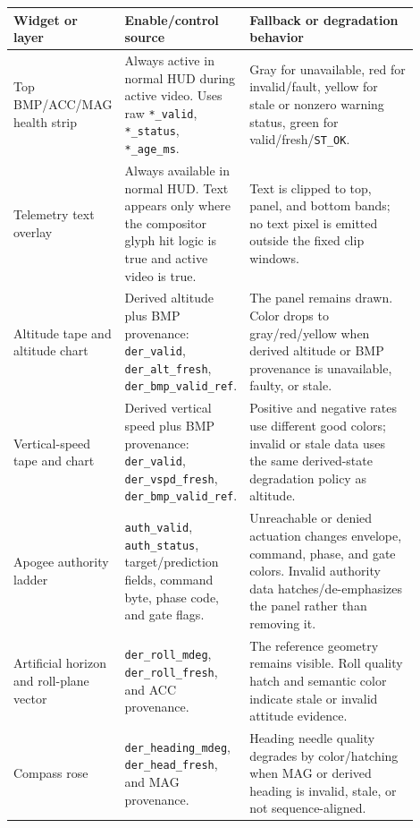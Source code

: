 \documentclass{article}
\newcommand{\sig}[1]{\begingroup\nolinkurl{#1}\endgroup}
\begin{document}
\begin{longtable}{p{0.24\linewidth} p{0.24\linewidth} p{0.42\linewidth}}
\toprule
\textbf{Widget or layer} & \textbf{Enable/control source} & \textbf{Fallback or degradation behavior} \\
\midrule
\endhead
Top BMP/ACC/MAG health strip &
Always active in normal HUD during active video.  Uses raw
\sig{*_valid}, \sig{*_status}, \sig{*_age_ms}. &
Gray for unavailable, red for invalid/fault, yellow for stale or nonzero
warning status, green for valid/fresh/\sig{ST_OK}. \\

Telemetry text overlay &
Always available in normal HUD.  Text appears only where the compositor glyph
hit logic is true and active video is true. &
Text is clipped to top, panel, and bottom bands; no text pixel is emitted
outside the fixed clip windows. \\

Altitude tape and altitude chart &
Derived altitude plus BMP provenance:
\sig{der_valid}, \sig{der_alt_fresh}, \sig{der_bmp_valid_ref}. &
The panel remains drawn.  Color drops to gray/red/yellow when derived altitude
or BMP provenance is unavailable, faulty, or stale. \\

Vertical-speed tape and chart &
Derived vertical speed plus BMP provenance:
\sig{der_valid}, \sig{der_vspd_fresh}, \sig{der_bmp_valid_ref}. &
Positive and negative rates use different good colors; invalid or stale data
uses the same derived-state degradation policy as altitude. \\

Apogee authority ladder &
\sig{auth_valid}, \sig{auth_status}, target/prediction fields, command byte,
phase code, and gate flags. &
Unreachable or denied actuation changes envelope, command, phase, and gate
colors.  Invalid authority data hatches/de-emphasizes the panel rather than
removing it. \\

Artificial horizon and roll-plane vector &
\sig{der_roll_mdeg}, \sig{der_roll_fresh}, and ACC provenance. &
The reference geometry remains visible.  Roll quality hatch and semantic color
indicate stale or invalid attitude evidence. \\

Compass rose &
\sig{der_heading_mdeg}, \sig{der_head_fresh}, and MAG provenance. &
Heading needle quality degrades by color/hatching when MAG or derived heading
is invalid, stale, or not sequence-aligned. \\


\end{longtable}
\end{document}
